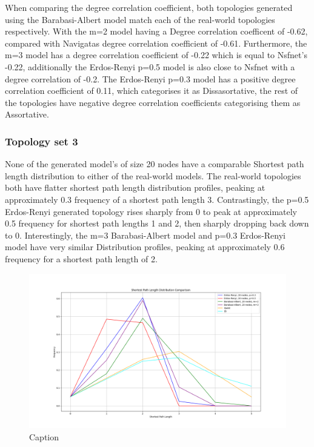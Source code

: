 When comparing the degree correlation coefficient, both topologies generated using the Barabasi-Albert model match each of the real-world topologies respectively. With the m=2 model having a Degree correlation coefficent of -0.62, compared with Navigatas degree correlation coefficient of -0.61. Furthermore, the m=3 model has a degree correlation coefficient of -0.22 which is equal to Nsfnet's -0.22, additionally the Erdos-Renyi p=0.5 model is also close to Nsfnet with a degree correlation of -0.2. The Erdos-Renyi p=0.3 model has a positive degree correlation coefficient of 0.11, which categorises it as Dissasortative, the rest of the topologies have negative degree correlation coefficients categorising them as Assortative.

\subsubsection{Topology set 3}
None of the generated model's of size 20 nodes have a comparable Shortest path length distribution to either of the real-world models. The real-world topologies both have flatter shortest path length distribution profiles, peaking at approximately 0.3 frequency of a shortest path length 3. Contrastingly, the p=0.5 Erdos-Renyi generated topology rises sharply from 0 to peak at approximately 0.5 frequency for shortest path lengths 1 and 2, then sharply dropping back down to 0. Interestingly, the m=3 Barabasi-Albert model and p=0.3 Erdos-Renyi model have very similar Distribution profiles, peaking at approximately 0.6 frequency for a shortest path length of 2. 

\begin{figure}
    \centering
    \includegraphics[width=0.9\linewidth]{images/FINAL-TOPO-COMP/line-20.png}
    \caption{Caption}
    \label{fig:enter-label}
\end{figure}

